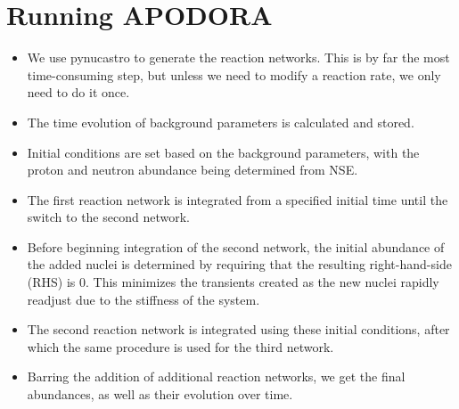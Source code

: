 \section{Running APODORA}
\label{sec:structure}

\begin{itemize}
    \item We use pynucastro to generate the reaction networks. This is by far the most time-consuming step, but unless we need to modify a reaction rate, we only need to do it once.
    \item The time evolution of background parameters is calculated and stored.
    \item Initial conditions are set based on the background parameters, with the proton and neutron abundance being determined from NSE.
    \item The first reaction network is integrated from a specified initial time until the switch to the second network. 
    \item Before beginning integration of the second network, the initial abundance of the added nuclei is determined by requiring that the resulting right-hand-side (RHS) is 0. This minimizes the transients created as the new nuclei rapidly readjust due to the stiffness of the system.
    \item The second reaction network is integrated using these initial conditions, after which the same procedure is used for the third network.
    \item Barring the addition of additional reaction networks, we get the final abundances, as well as their evolution over time. %
\end{itemize}

